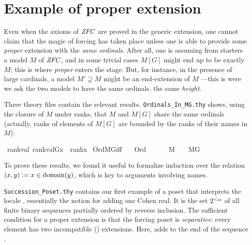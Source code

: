 \section{Example of proper extension}
\label{sec:example-proper-extension}

Even when the axioms of $\mathit{ZFC}$ are proved in the generic extension,
one cannot claim that the magic of forcing has taken place unless one
is able to provide some \emph{proper} extension with the \emph{same
ordinals}. After all, one is assuming from starters a model $M$ of $\mathit{ZFC}$,
and in some trivial cases $M[G]$ might end up to be exactly $M$; this
is where \emph{proper} enters the stage. But, for instance, in the
presence of large cardinals, a model $M'\supsetneq M$ might be an
end-extension of $M$ ---this is were we ask the two models to have the
same ordinals, the same \emph{height}. 

Three theory files contain the relevant
results. \verb|Ordinals_In_MG.thy| shows, using the closure of $M$
under ranks, that $M$ and $M[G]$ share the same ordinals (actually,
ranks of elements of $M[G]$ are bounded by the ranks of their names in
$M$):
\begin{isabelle}
\isamarkupfalse%
\ rank{\isacharunderscore}val{\isacharcolon}\ {\isachardoublequoteopen}rank{\isacharparenleft}val{\isacharparenleft}G{\isacharcomma}x{\isacharparenright}{\isacharparenright}\ {\isasymle}\ rank{\isacharparenleft}x{\isacharparenright}{\isachardoublequoteclose}\isanewline
{}\isamarkupfalse%
\ Ord{\isacharunderscore}MG{\isacharunderscore}iff{\isacharcolon}\isanewline
\ \ \ {\isachardoublequoteopen}Ord{\isacharparenleft}{\isasymalpha}{\isacharparenright}{\isachardoublequoteclose}\ \isanewline
\ \ \ {\isachardoublequoteopen}{\isasymalpha}\ {\isasymin}\ M\ {\isasymlongleftrightarrow}\ {\isasymalpha}\ {\isasymin}\ M{\isacharbrackleft}G{\isacharbrackright}{\isachardoublequoteclose}
\end{isabelle}
To prove these results, we found it useful to formalize induction over
the relation $(x,y) \mathrel{\mathop:}= x\in\operatorname{domain}(y)$, which is key
to arguments involving names.

\verb|Succession_Poset.thy| contains our first example of a poset
that interprets the locale
, essentially the notion for
adding one Cohen real. It is the set $2^{<\omega}$ of all finite binary
sequences partially  ordered by reverse inclusion.
The sufficient condition for a proper extension is that
the forcing poset is \emph{separative}: every element has two
incompatible () extensions. Here,
adds  to the end of the sequence .

